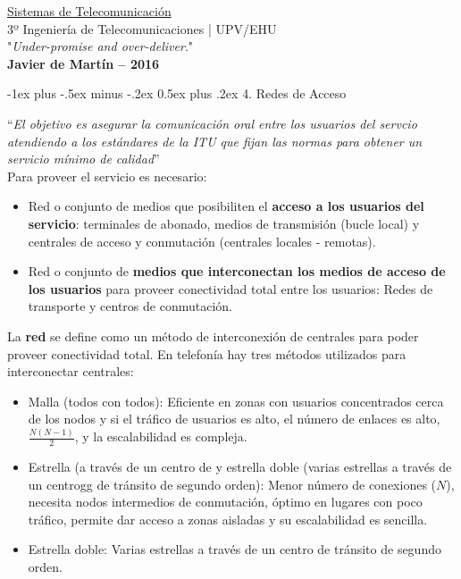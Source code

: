 \documentclass[10pt,portrait, twocolumn]{article}
\makeatletter
\renewcommand{\section}{\@startsection{section}{1}{0mm}%
                                {-1ex plus -.5ex minus -.2ex}%
                                {0.5ex plus .2ex}%
                                {\normalfont\large\bfseries}}
\makeatother
\begin{document}
\begin{framed}
	\begin{center}
    	\Large{\underline{Sistemas de Telecomunicación}} \\
    	\scriptsize{3º Ingeniería de Telecomunicaciones | UPV/EHU}\\
     	"\textsl{Under-promise and over-deliver}." \\
     	\small{\textbf{Javier de Martín -- 2016}}
	\end{center}
\end{framed}


\hrulefill

\section{4. Redes de Acceso}

\hrulefill

``\textit{El objetivo es asegurar la comunicación oral entre los usuarios del servcio atendiendo a los estándares de la ITU que fijan las normas para obtener un servicio mínimo de calidad}''\\

Para proveer el servicio es necesario:

\begin{itemize}
	\item Red o conjunto de medios que posibiliten el \textbf{acceso a los usuarios del servicio}: terminales de abonado, medios de transmisión (bucle local) y centrales de acceso y conmutación (centrales locales - remotas).
	\item Red o conjunto de \textbf{medios que interconectan los medios de acceso de los usuarios} para proveer conectividad total entre los usuarios: Redes de transporte y centros de conmutación.
\end{itemize}

La \textbf{red} se define como un método de interconexión de centrales para poder proveer conectividad total. En telefonía hay tres métodos utilizados para interconectar centrales:

	\begin{itemize}
		\item Malla (todos con todos): Eficiente en zonas con usuarios concentrados cerca de los nodos y si el tráfico de usuarios es alto, el número de enlaces es alto, $\frac{N(N-1)}{2}$, y la escalabilidad es compleja.
		\item Estrella (a través de un centro de y estrella doble (varias estrellas a través de un centrogg de tránsito de segundo orden): Menor número de conexiones ($N$), necesita nodos intermedios de conmutación, óptimo en lugares con poco tráfico, permite dar acceso a zonas aisladas y su escalabilidad es sencilla.
		\item Estrella doble: Varias estrellas a través de un centro de tránsito de segundo orden.
	\end{itemize}
\end{document}
